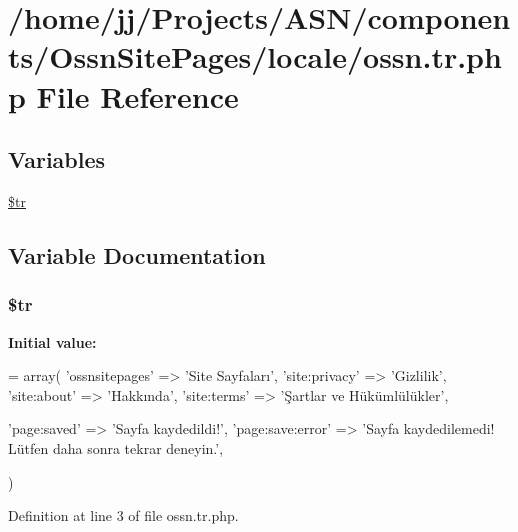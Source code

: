 \hypertarget{components_2_ossn_site_pages_2locale_2ossn_8tr_8php}{}\section{/home/jj/\+Projects/\+A\+S\+N/components/\+Ossn\+Site\+Pages/locale/ossn.tr.\+php File Reference}
\label{components_2_ossn_site_pages_2locale_2ossn_8tr_8php}
\subsection*{Variables}
\begin{DoxyCompactItemize}
\item 
\hyperlink{components_2_ossn_site_pages_2locale_2ossn_8tr_8php_a925f466a276b200c71b2567d39b4dba7}{\$tr}
\end{DoxyCompactItemize}


\subsection{Variable Documentation}
\subsubsection[{\texorpdfstring{\$tr}{$tr}}]{\setlength{\rightskip}{0pt plus 5cm}\$tr}\hypertarget{components_2_ossn_site_pages_2locale_2ossn_8tr_8php_a925f466a276b200c71b2567d39b4dba7}{}\label{components_2_ossn_site_pages_2locale_2ossn_8tr_8php_a925f466a276b200c71b2567d39b4dba7}
{\bfseries Initial value\+:}
\begin{DoxyCode}
= array(
    \textcolor{stringliteral}{'ossnsitepages'} => \textcolor{stringliteral}{'Site Sayfaları'},
    \textcolor{stringliteral}{'site:privacy'} => \textcolor{stringliteral}{'Gizlilik'},
    \textcolor{stringliteral}{'site:about'} => \textcolor{stringliteral}{'Hakkında'},
    \textcolor{stringliteral}{'site:terms'} => \textcolor{stringliteral}{'Şartlar ve Hükümlülükler'},

    \textcolor{stringliteral}{'page:saved'} => \textcolor{stringliteral}{'Sayfa kaydedildi!'},
    \textcolor{stringliteral}{'page:save:error'} => \textcolor{stringliteral}{'Sayfa kaydedilemedi! Lütfen daha sonra tekrar deneyin.'},

)
\end{DoxyCode}


Definition at line 3 of file ossn.\+tr.\+php.


